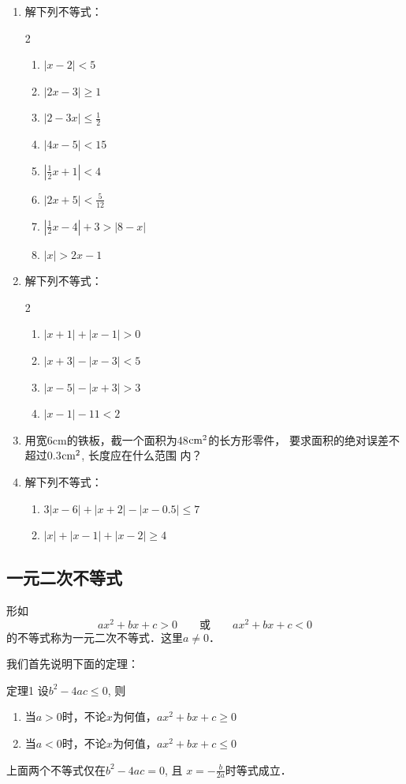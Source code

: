 \begin{ex}
\begin{enumerate}
    \item 解下列不等式：
\begin{multicols}{2}
\begin{enumerate}
    \item $|x-2|<5$
    \item $|2x-3|\ge 1$
    \item $|2-3x|\le \frac{1}{2}$
    \item $|4x-5|<15$
    \item $\left|\frac{1}{2}x+1\right|<4$
    \item $|2x+5|<\frac{5}{12}$
    \item $\left|\frac{1}{2}x-4\right|+3>|8-x|$
    \item $|x|>2x-1$
\end{enumerate}    
\end{multicols}

\item 解下列不等式：
\begin{multicols}{2}
\begin{enumerate}
    \item $|x+1|+|x-1|>0$
    \item $|x+3|-|x-3|<5$
    \item $|x-5|-|x+3|>3$
    \item $|x-1|-11<2$
\end{enumerate}
\end{multicols}
\item 用宽6cm的铁板，截一个面积为48${\rm cm}^2$的长方形零件，
要求面积的绝对误差不超过0.3${\rm cm}^2$, 长度应在什么范围
内？
\item 解下列不等式：
\begin{enumerate}
    \item $3|x-6|+|x+2|-|x-0.5|\le 7$
    \item $|x|+|x-1|+|x-2|\ge 4$
\end{enumerate}
\end{enumerate}
\end{ex}

\subsection{一元二次不等式}
形如
\[ax^2+bx+c>0 \qquad \text{或}\qquad  ax^2+bx+c<0 \]
的不等式称为一元二次不等式．这里$a\ne 0$．

我们首先说明下面的定理：
\begin{blk}{定理1}
    设$b^2-4ac\le 0$, 则
\begin{enumerate}
    \item 当$a>0$时，不论$x$为何值，$ax^2+bx+c\ge 0$
    \item 当$a<0$时，不论$x$为何值，$ax^2+bx+c\le 0$
\end{enumerate} 
上面两个不等式仅在$b^2-4ac=0$, 且
$x=-\frac{b}{2a}$时等式成立．
\end{blk}

